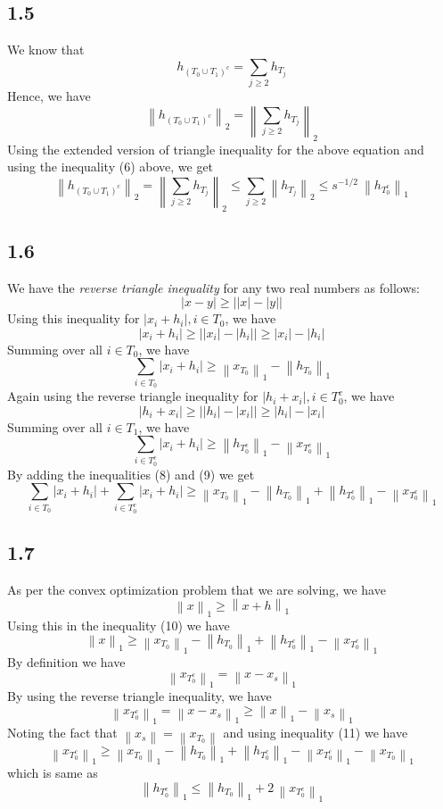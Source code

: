 \documentclass[12pt]{article}
\newcommand{\norm}[1]{\left\lVert #1 \right\rVert}
\begin{document}
\subsection*{1.5}
We know that 
$$h_{(T_0 \cup T_1)^c} = \sum_{j \geq 2} h_{T_j}$$
Hence, we have
$$\norm{h_{(T_0 \cup T_1)^c}}_2 = \norm{\sum_{j \geq 2} h_{T_j}}_2$$
Using the extended version of triangle inequality for the above equation and using the inequality (6) above,  we get
\begin{equation}
	\norm{h_{(T_0 \cup T_1)^c}}_2 = \norm{\sum_{j \geq 2} h_{T_j}}_2 \leq \sum_{j \geq 2} \norm{h_{T_j}}_2 \leq s^{-1/2} \:\norm{h_{T_0^c}}_1
\end{equation}
\subsection*{1.6}
We have the \textit{reverse triangle inequality} for any two real numbers as follows:
$$|x - y| \geq \bigg||x| - |y|\bigg|$$
Using this inequality for $|x_i + h_i|, i \in T_0$, we have
$$|x_i + h_i| \geq \bigg||x_i| - |h_i|\bigg| \geq |x_i| - |h_i|$$
Summing over all $i \in T_0$, we have
\begin{equation}
\sum \limits_{i \in T_0}|x_i + h_i| \geq \norm{x_{T_0}}_1 - \norm{h_{T_0}}_1
\end{equation}
Again using the reverse triangle inequality for $|h_i + x_i|, i \in T_0^c$, we have
$$|h_i + x_i| \geq \bigg||h_i| - |x_i|\bigg| \geq |h_i| - |x_i|$$
Summing over all $i \in T_1$, we have
\begin{equation}
\sum \limits_{i \in T_0^c}|x_i + h_i| \geq \norm{h_{T_0^c}}_1 - \norm{x_{T_0^c}}_1
\end{equation}
By adding the inequalities (8) and (9) we get
\begin{equation}
	\sum \limits_{i \in T_0}|x_i + h_i| + \sum \limits_{i \in T_0^c}|x_i + h_i| \geq \norm{x_{T_0}}_1 - \norm{h_{T_0}}_1 + \norm{h_{T_0^c}}_1 - \norm{x_{T_0^c}}_1
\end{equation}
\subsection*{1.7}
As per the convex optimization problem that we are solving, we have
$$\norm{x}_1 \geq \norm{x + h}_1$$
Using this in the inequality (10) we have
\begin{equation}
	\norm{x}_1 \geq \norm{x_{T_0}}_1 - \norm{h_{T_0}}_1 + \norm{h_{T_0^c}}_1 - \norm{x_{T_0^c}}_1
\end{equation}
By definition we have
$$\norm{x_{T_0^c}}_1 = \norm{x - x_s}_1$$
By using the reverse triangle inequality, we have
$$\norm{x_{T_0^c}}_1 = \norm{x - x_s}_1 \geq \norm{x}_1 - \norm{x_s}_1$$
Noting the fact that $\norm{x_s} = \norm{x_{T_0}}$ and using inequality (11) we have
$$\norm{x_{T_0^c}}_1 \geq \norm{x_{T_0}}_1 - \norm{h_{T_0}}_1 + \norm{h_{T_0^c}}_1 - \norm{x_{T_0^c}}_1 - \norm{x_{T_0}}_1$$
which is same as
\begin{equation}
\norm{h_{T_0^c}}_1 \leq \norm{h_{T_0}}_1 + 2\,\norm{x_{T_0^c}}_1
\end{equation}
\end{document}
